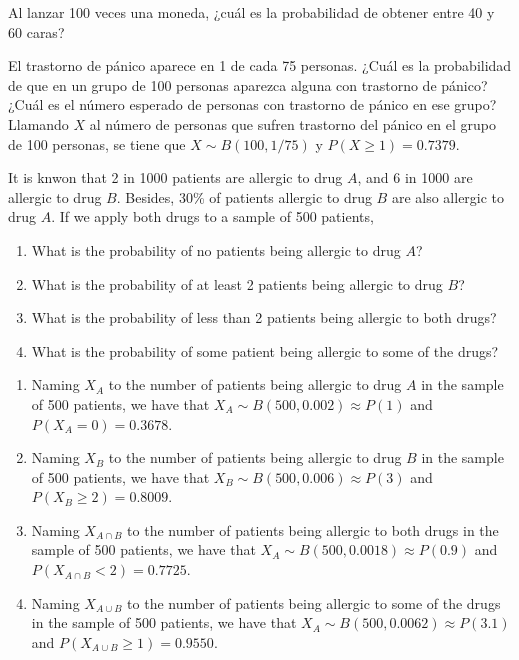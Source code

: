 {Al lanzar 100 veces una moneda, ¿cuál es la probabilidad de obtener entre 40 y 60 caras?
}
{}
{}


{El trastorno de pánico aparece en 1 de cada 75 personas.
¿Cuál es la probabilidad de que en un grupo de 100 personas aparezca alguna con trastorno de pánico?
¿Cuál es el número esperado de personas con trastorno de pánico en ese grupo?
}
{Llamando $X$ al número de personas que sufren trastorno del pánico en el grupo de 100 personas, se tiene que $X\sim
B(100,1/75)$ y $P(X\geq 1)=0.7379$.}
{}


{It is knwon that 2 in 1000 patients are allergic to drug $A$, and 6 in 1000 are allergic to drug $B$.
Besides, 30\% of patients allergic to drug $B$ are also allergic to drug $A$.
If we apply both drugs to a sample of 500 patients,
\begin{enumerate}
\item What is the probability of no patients being allergic to drug $A$?
\item What is the probability of at least 2 patients being allergic to drug $B$?
\item What is the probability of less than 2 patients being allergic to both drugs?
\item What is the probability of some patient being allergic to some of the drugs?
\end{enumerate}
}
{
\begin{enumerate}
\item Naming $X_A$ to the number of patients being allergic to drug $A$ in the sample of 500 patients, we have that $X_A\sim B(500,0.002)\approx P(1)$ and $P(X_A=0)=0.3678$.
\item Naming $X_B$ to the number of patients being allergic to drug $B$ in the sample of 500 patients, we have that $X_B\sim B(500,0.006)\approx P(3)$ and $P(X_B\geq 2)=0.8009$.
\item Naming $X_{A\cap B}$ to the number of patients being allergic to both drugs in the sample of 500 patients, we have that $X_A\sim B(500,0.0018)\approx P(0.9)$ and $P(X_{A\cap B}<2)=0.7725$.
\item Naming $X_{A\cup B}$ to the number of patients being allergic to some of the drugs in the sample of 500 patients, we have that $X_A\sim B(500,0.0062)\approx P(3.1)$ and $P(X_{A\cup B}\geq 1)=0.9550$.
\end{enumerate}
}
{}



